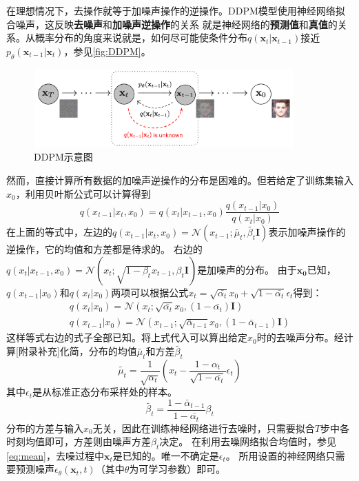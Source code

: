 在理想情况下，去操作就等于加噪声操作的逆操作。DDPM模型使用神经网络拟合噪声，这反映\textbf{去噪声}和\textbf{加噪声逆操作}的关系
就是神经网络的\textbf{预测值}和\textbf{真值}的关系。从概率分布的角度来说就是，如何尽可能使条件分布$q(\mathbf{x}_t|\mathbf{x}_{t-1})$接近$p_{\theta}(\mathbf{x}_{t-1}|\mathbf{x}_t)$，参见\autoref{fig:DDPM}。
\begin{figure}[!htbp]
    \centering
    \includegraphics[width=10cm]{image/chap02/DDPM.png}
    \caption{DDPM示意图}
    \label{fig:DDPM}
\end{figure}
然而，直接计算所有数据的加噪声逆操作的分布是困难的。但若给定了训练集输入$x_0$，利用贝叶斯公式可以计算得到
$$
q(x_{t-1}|x_t,x_0)=q(x_t|x_{t-1},x_0)\dfrac{q(x_{t-1}|x_0)}{q(x_t|x_0)} 
$$
在上面的等式中，左边的$q(x_{t-1}|x_t,x_0)=\mathcal{N}(x_{t-1};\tilde{\mu_t},\tilde{\beta_t}\mathbf{I})$表示加噪声操作的逆操作，它的均值和方差都是待求的。
右边的$q(x_t|x_{t-1},x_0)=\mathcal{N}(x_t;\sqrt{1-\beta_t}x_{t-1},\beta_t\mathbf{I})$是加噪声的分布。
由于$\mathbf{x_0}$已知，$q(x_{t-1}|x_0)$和$q(x_t|x_0)$两项可以根据公式$x_t=\sqrt{\bar{\alpha_t}}x_0+\sqrt{1-\bar{\alpha_t}}\epsilon_t$得到：
\begin{equation}
    \begin{split}
        q(x_t|x_0)=\mathcal{N}(x_t;\sqrt{\bar{\alpha_t}}x_0,(1-\bar{\alpha_t})\mathbf{I}) \\
        q(x_{t-1}|x_0)=\mathcal{N}(x_{t-1};\sqrt{\bar{\alpha}_{t-1}}x_0,(1-\bar{\alpha}_{t-1})\mathbf{I})
    \end{split}
\end{equation}
这样等式右边的式子全部已知。将上式代入可以算出给定$x_0$时的去噪声分布。经计算[附录补充]化简，分布的均值$\tilde{\mu_t}$和方差$\tilde{\beta_t}$
\begin{equation}
    \label{eq:mean}
    \tilde{\mu_t}=\frac{1}{\sqrt{\alpha_t}}(x_t-\frac{1-\alpha_t}{\sqrt{1-\bar{\alpha_t}}}\epsilon_t)
\end{equation}
其中$\epsilon_t$是从标准正态分布采样处的样本。
\begin{equation}
    \tilde{\beta_t}=\frac{1-\bar{\alpha}_{t-1}}{1-\bar{\alpha_t}}\beta_t
\end{equation}
分布的方差与输入$x_0$无关，因此在训练神经网络进行去噪时，只需要拟合$T$步中各时刻均值即可，方差则由噪声方差$\beta_t$决定。
在利用去噪网络拟合均值时，参见\autoref{eq:mean}，去噪过程中$\mathbf{x}_t$是已知的。唯一不确定是$\epsilon_t$。
所用设置的神经网络只需要预测噪声$\epsilon_{\theta}(\mathbf{x}_t,t)$（其中$\theta$为可学习参数）即可。

